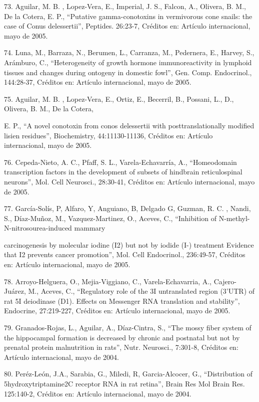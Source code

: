 73. Aguilar, M. B. , Lopez-Vera, E., Imperial, J. S., Falcon, A., Olivera, B. M., De la Cotera, E. P., “Putative 
gamma-conotoxins in vermivorous cone snails: the case of Conus delessertii”, Peptides. 26:23-7, Créditos en: Artículo 
internacional, mayo de 2005.

74. Luna, M., Barraza, N., Berumen, L., Carranza, M., Pedernera, E., Harvey, S., Arámburo, C., “Heterogeneity of growth hormone 
immunoreactivity in lymphoid tissues and changes during ontogeny in domestic fowl”, Gen. Comp. Endocrinol., 144:28-37, Créditos 
en: Artículo internacional, mayo de 2005.

75. Aguilar, M. B. , Lopez-Vera, E., Ortiz, E., Becerril, B., Possani, L., D., Olivera, B. M., De la Cotera,

E. P., “A novel conotoxin from conos delessertii with posttranslationally modified lisien residues”, Biochemistry, 
44:11130-11136, Créditos en: Artículo internacional, mayo de 2005.

76. Cepeda-Nieto, A. C., Pfaff, S. L., Varela-Echavarría, A., “Homeodomain transcription factors in the development of subsets 
of hindbrain reticulospinal neurons”, Mol. Cell Neurosci., 28:30-41, Créditos en: Artículo internacional, mayo de 2005.

77. García-Solís, P, Alfaro, Y, Anguiano, B, Delgado G, Guzman, R. C. , Nandi, S., Díaz-Muñoz, M., Vazquez-Martinez, O., 
Aceves, C., “Inhibition of N-methyl-N-nitrosourea-induced mammary

carcinogenesis by molecular iodine (I2) but not by iodide (I-) treatment Evidence that I2 prevents cancer promotion”, Mol. Cell 
Endocrinol., 236:49-57, Créditos en: Artículo internacional, mayo de 2005.

78. Arroyo-Helguera, O., Mejia-Viggiano, C., Varela-Echavarria, A., Cajero-Juárez, M., Aceves, C., “Regulatory role of the 3I 
untranslated region (3’UTR) of rat 5I deiodinase (D1). Effects on Messenger RNA translation and stability”, Endocrine, 
27:219-227, Créditos en: Artículo internacional, mayo de 2005.

79. Granados-Rojas, L., Aguilar, A., Díaz-Cintra, S., “The mossy fiber system of the hippocampal formation is decreased by 
chronic and postnatal but not by prenatal protein malnutrition in rats”, Nutr. Neurosci., 7:301-8, Créditos en: Artículo 
internacional, mayo de 2004.

80. Peréz-León, J.A., Sarabia, G., Miledi, R, Garcia-Alcocer, G., “Distribution of 5hydroxytriptamine2C receptor RNA in rat 
retina”, Brain Res Mol Brain Res. 125:140-2, Créditos en: Artículo internacional, mayo de 2004.

